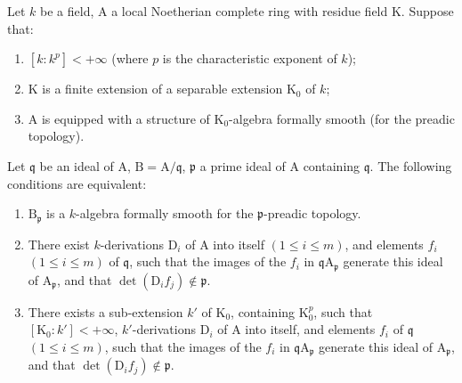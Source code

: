 \begin{theorem}[22.7.3]
\label{0.22.7.3}
Let $k$ be a field, $\mathrm{A}$ a local Noetherian complete ring with residue field $\mathrm{K}$.
Suppose that:
\begin{enumerate}
  \item[$1^\circ$] $[k:k^p]<+\infty$ (where $p$ is the characteristic exponent of $k$);
  \item[$2^\circ$] $\mathrm{K}$ is a finite extension of a separable extension $\mathrm{K}_0$ of $k$;
  \item[$3^\circ$] $\mathrm{A}$ is equipped with a structure of $\mathrm{K}_0$-algebra formally smooth (for the preadic topology).
\end{enumerate}
Let $\mathfrak{q}$ be an ideal of $\mathrm{A}$, $\mathrm{B}=\mathrm{A}/\mathfrak{q}$, $\mathfrak{p}$ a prime ideal of $\mathrm{A}$ containing $\mathfrak{q}$.
The following conditions are equivalent:
\begin{enumerate}
  \item[a)] $\mathrm{B}_\mathfrak{p}$ is a $k$-algebra formally smooth for the $\mathfrak{p}$-preadic topology.
  \item[b)] There exist $k$-derivations $\mathrm{D}_i$ of $\mathrm{A}$ into itself $(1\leq i\leq m)$, and elements $f_i$ $(1\leq i\leq m)$ of $\mathfrak{q}$, such that the images of the $f_i$ in $\mathfrak{q}\mathrm{A}_\mathfrak{p}$ generate this ideal of $\mathrm{A}_\mathfrak{p}$, and that $\det(\mathrm{D}_if_j)\notin\mathfrak{p}$.
  \item[b')] There exists a sub-extension $k'$ of $\mathrm{K}_0$, containing $\mathrm{K}_0^p$, such that $[\mathrm{K}_0:k']<+\infty$, $k'$-derivations $\mathrm{D}_i$ of $\mathrm{A}$ into itself, and elements $f_i$ of $\mathfrak{q}$ $(1\leq i\leq m)$, such that the images of the $f_i$ in $\mathfrak{q}\mathrm{A}_\mathfrak{p}$ generate this ideal of $\mathrm{A}_\mathfrak{p}$, and that $\det(\mathrm{D}_if_j)\notin\mathfrak{p}$.
\end{enumerate}
\end{theorem}

